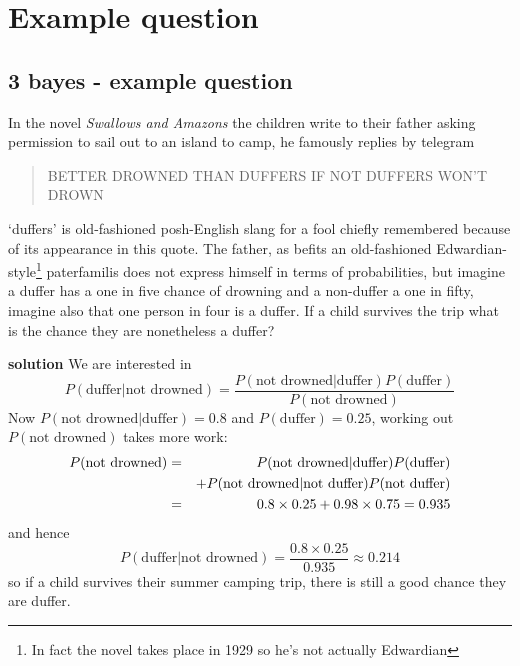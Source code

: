 
\ifind
\section*{Example question}
\else
\subsection*{3 bayes - example question}
\fi In the novel \textit{Swallows and Amazons} the children write to
their father asking permission to sail out to an island to camp, he famously replies by telegram
\begin{quote}
  BETTER DROWNED THAN DUFFERS IF NOT DUFFERS WON'T DROWN
\end{quote}
`duffers' is old-fashioned posh-English slang for a fool chiefly
remembered because of its appearance in this quote. The father, as
befits an old-fashioned Edwardian-style\footnote{In fact the novel
  takes place in 1929 so he's not actually Edwardian} paterfamilis does not
express himself in terms of probabilities, but imagine a duffer has a
one in five chance of drowning and a non-duffer a one in fifty,
imagine also that one person in four is a duffer. If a child survives
the trip what is the chance they are nonetheless a duffer?

\noindent \textbf{solution} We are interested in
\begin{equation}
  P(\mbox{duffer}|\mbox{not drowned})=\frac{P(\mbox{not drowned}|\mbox{duffer})P(\mbox{duffer})}{P(\mbox{not drowned})}
\end{equation}
Now $P(\mbox{not drowned}|\mbox{duffer})=0.8$ and $P(\mbox{duffer})=0.25$, working out $P(\mbox{not drowned})$ takes more work:
\begin{eqnarray}
  P(\mbox{not drowned})&=&P(\mbox{not drowned}|\mbox{duffer})P(\mbox{duffer})\cr&& +P(\mbox{not drowned}|\mbox{not duffer})P(\mbox{not duffer})\cr &=&0.8\times 0.25+0.98\times 0.75=0.935
\end{eqnarray}
and hence
\begin{equation}
  P(\mbox{duffer}|\mbox{not drowned})=\frac{0.8\times 0.25}{0.935}\approx 0.214
\end{equation}
so if a child survives their summer camping trip, there is still a
good chance they are duffer.
